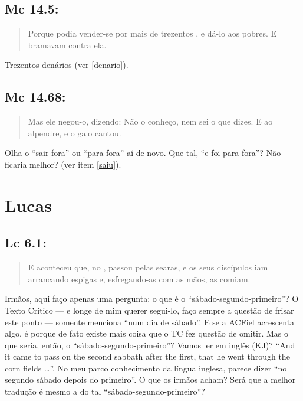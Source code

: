 \subsection*{Mc 14.5:}
\begin{quote}
    \small
Porque podia vender-se por mais de trezentos , e dá-lo aos pobres. E bramavam contra ela.
\end{quote}

Trezentos denários (ver \ref{denario}).

\subsection*{Mc 14.68:}
\begin{quote}
    \small
Mas ele negou-o, dizendo: Não o conheço, nem sei o que dizes. E  ao alpendre, e o galo cantou.
    \end{quote}
    
Olha o ``sair fora'' ou ``para fora'' aí de novo. Que tal, ``e foi para fora''? Não ficaria melhor? (ver item \ref{saiu}).

\section{Lucas}
\subsection*{Lc 6.1:}
\begin{quote}
    \small
E aconteceu que, no , passou pelas searas, e os seus discípulos iam arrancando espigas e, esfregando-as com as mãos, as comiam.
\end{quote}

Irmãos, aqui faço apenas uma pergunta: o que é o ``sá\-ba\-do-se\-gun\-do-pri\-mei\-ro''? O Texto Crítico --- e longe de mim querer segui-lo, faço sempre a questão de frisar este ponto --- somente menciona ``num dia de sábado''. E se a ACFiel acrescenta algo, é porque de fato existe mais coisa que o TC fez questão de omitir. Mas o que seria, então, o ``sábado-segundo-primeiro''? Vamos ler em inglês
(KJ)? ``And it came to pass on the second sabbath after the first, that he went through the corn fields \ldots''. No meu parco conhecimento da língua inglesa, parece dizer ``no segundo sábado depois do primeiro''. O que os irmãos acham? Será que a melhor tradução é mesmo a do tal ``sábado-segundo-primeiro''?

